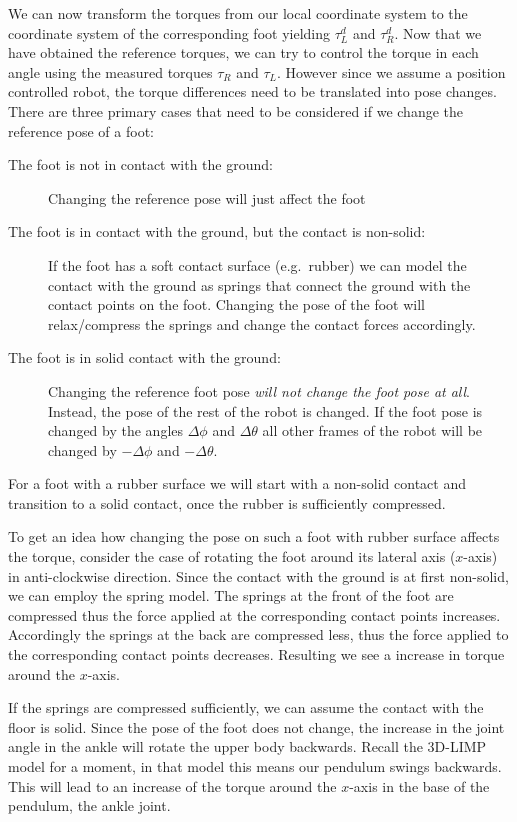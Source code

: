 \documentclass[english,ngerman]{KITreprt}
\begin{document}
We can now transform the torques from our local coordinate system to the
coordinate system of the corresponding foot yielding $\tau^d_L$ and
$\tau^d_R$. Now that we have obtained the reference torques, we can try
to control the torque in each angle using the measured torques $\tau_R$
and $\tau_L$. However since we assume a position controlled robot, the
torque differences need to be translated into pose changes. There are
three primary cases that need to be considered if we change the
reference pose of a foot:

\begin{description}
\item[The foot is not in contact with the ground:]
Changing the reference pose will just affect the foot
\item[The foot is in contact with the ground, but the contact is
non-solid:]
If the foot has a soft contact surface (e.g.~rubber) we can model the
contact with the ground as springs that connect the ground with the
contact points on the foot. Changing the pose of the foot will
relax/compress the springs and change the contact forces accordingly.
\item[The foot is in solid contact with the ground:]
Changing the reference foot pose \emph{will not change the foot pose at
all}. Instead, the pose of the rest of the robot is changed. If the foot
pose is changed by the angles $\Delta \phi$ and $\Delta \theta$ all
other frames of the robot will be changed by $-\Delta \phi$ and
$-\Delta \theta$.
\end{description}

For a foot with a rubber surface we will start with a non-solid contact
and transition to a solid contact, once the rubber is sufficiently
compressed. \cite{kajita2005running}

To get an idea how changing the pose on such a foot with rubber surface
affects the torque, consider the case of rotating the foot around its
lateral axis ($x$-axis) in anti-clockwise direction. Since the contact
with the ground is at first non-solid, we can employ the spring model.
The springs at the front of the foot are compressed thus the force
applied at the corresponding contact points increases. Accordingly the
springs at the back are compressed less, thus the force applied to the
corresponding contact points decreases. Resulting we see a increase in
torque around the $x$-axis.

If the springs are compressed sufficiently, we can assume the contact
with the floor is solid. Since the pose of the foot does not change, the
increase in the joint angle in the ankle will rotate the upper body
backwards. Recall the 3D-LIMP model for a moment, in that model this
means our pendulum swings backwards. This will lead to an increase of
the torque around the $x$-axis in the base of the pendulum, the ankle
joint.
\end{document}
